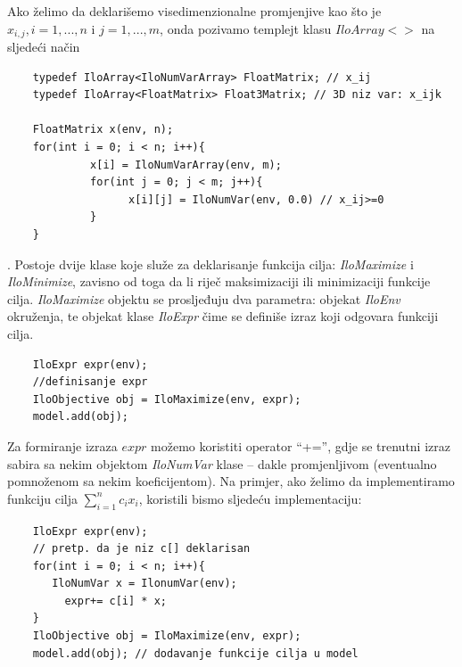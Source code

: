 \documentclass[a4paper, utf8, 11pt, colorlinks]{book}
\theoremstyle{definition}
\begin{document}
 \noindent Ako želimo da deklarišemo visedimenzionalne promjenjive kao što je $x_{i,j}, i=1,...,n$ i $j=1,...,m$, onda pozivamo templejt klasu ${IloArray}<>$ na sljedeći način
 
 \begin{verbatim}
 	typedef IloArray<IloNumVarArray> FloatMatrix; // x_ij 
 	typedef IloArray<FloatMatrix> Float3Matrix; // 3D niz var: x_ijk
 	
 	FloatMatrix x(env, n);
 	for(int i = 0; i < n; i++){
 		     x[i] = IloNumVarArray(env, m);
 		     for(int j = 0; j < m; j++){
 		  	       x[i][j] = IloNumVar(env, 0.0) // x_ij>=0
 		     }
 	}
 \end{verbatim}
 
 . 
 Postoje dvije klase koje služe za deklarisanje funkcija cilja: \emph{IloMaximize} i \emph{IloMinimize}, zavisno od toga da li riječ maksimizaciji ili minimizaciji funkcije cilja.  \emph{IloMaximize} objektu se prosljeđuju dva parametra: objekat \emph{IloEnv} okruženja, te objekat klase \emph{IloExpr} čime se definiše  izraz koji odgovara funkciji cilja. 
 
 \begin{verbatim}
 	IloExpr expr(env);
 	//definisanje expr
 	IloObjective obj = IloMaximize(env, expr);
 	model.add(obj);
 \end{verbatim}
 
 \noindent Za formiranje izraza $expr$ možemo koristiti operator  ``+='', gdje se trenutni izraz sabira sa nekim objektom \emph{IloNumVar} klase -- dakle promjenljivom (eventualno pomnoženom sa nekim koeficijentom). 
 Na primjer, ako želimo da implementiramo funkciju cilja $\sum_{i=1}^n c_i x_i$, koristili bismo sljedeću implementaciju:
 
 \begin{verbatim}
 	IloExpr expr(env);
 	// pretp. da je niz c[] deklarisan
 	for(int i = 0; i < n; i++){
       IloNumVar x = IlonumVar(env);
 	     expr+= c[i] * x;
 	}
 	IloObjective obj = IloMaximize(env, expr);
 	model.add(obj); // dodavanje funkcije cilja u model
 \end{verbatim}
 
\end{document}
